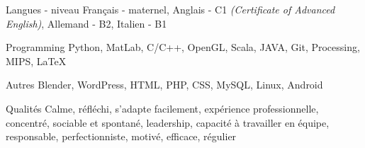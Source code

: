 

\begin{cvskills}

\cvskill
    {Langues - niveau} %
    {Français - maternel, Anglais - C1 \textit{(Certificate of Advanced English)},  Allemand - B2, Italien - B1} %

  \cvskill
    {Programming} %
    {Python, MatLab, C/C++, OpenGL, Scala, JAVA, Git, Processing, MIPS, LaTeX} %

  \cvskill
    {Autres} %
    {Blender, WordPress, HTML, PHP, CSS, MySQL, Linux, Android} %

\cvskill
{Qualités}
{Calme, réfléchi, s'adapte facilement, expérience professionnelle, concentré, sociable et spontané, leadership, \newline capacité à travailler en équipe, responsable, perfectionniste, motivé, efficace, régulier}
  
\end{cvskills}
